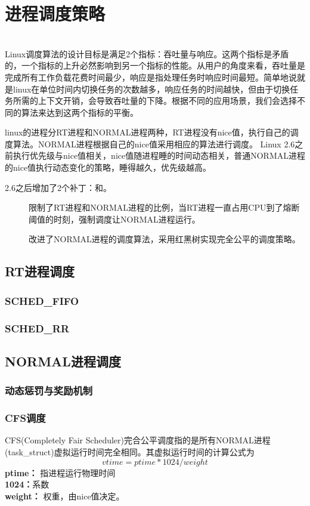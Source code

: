 \chapter{进程调度策略}
~\\\indent Linux调度算法的设计目标是满足2个指标：吞吐量与响应。这两个指标是矛盾的，一个指标的上升必然影响到另一个指标的性能。从用户的角度来看，吞吐量是完成所有工作负载花费时间最少，响应是指处理任务时响应时间最短。简单地说就是linux在单位时间内切换任务的次数越多，响应任务的时间越快，但由于切换任务所需的上下文开销，会导致吞吐量的下降。根据不同的应用场景，我们会选择不同的算法来达到这两个指标的平衡。

linux的进程分RT进程和NORMAL进程两种，RT进程没有nice值，执行自己的调度算法。NORMAL进程根据自己的nice值采用相应的算法进行调度。
Linux 2.6之前执行优先级与nice值相关，nice值随进程睡的时间动态相关，普通NORMAL进程的nice值执行动态变化的策略，睡得越久，优先级越高。

2.6之后增加了2个补丁：和。
\begin{description}
  \item[{}] 限制了RT进程和NORMAL进程的比例，当RT进程一直占用CPU到了熔断阈值的时刻，强制调度让NORMAL进程运行。
  \item[{}] 改进了NORMAL进程的调度算法，采用红黑树实现完全公平的调度策略。
\end{description}
\clearpage

\section{RT进程调度}
\subsection{SCHED\_FIFO}
\subsection{SCHED\_RR}


\section{NORMAL进程调度}
\subsection{动态惩罚与奖励机制}
\subsection{CFS调度}
CFS(Completely Fair Scheduler)完合公平调度指的是所有NORMAL进程(task\_struct)虚拟运行时间完全相同。其虚拟运行时间的计算公式为
$$vtime = ptime * 1024 /weight $$
\noindent\textbf{ptime：} 指进程运行物理时间\\
\textbf{1024：}系数\\
\textbf{weight：} 权重，由nice值决定。\\


